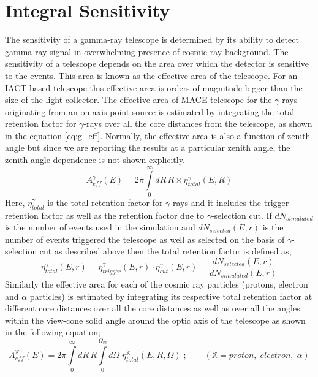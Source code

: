\documentclass[preprint,12pt]{elsarticle}
\begin{document}
\section{Integral Sensitivity}
The sensitivity of a gamma-ray telescope is determined by its ability to detect
gamma-ray signal in overwhelming presence of cosmic ray background. 
The sensitivity of a telescope depends on the area over which the detector is sensitive 
to the events. This area is known as the effective area of the telescope. For an IACT based telescope 
this effective area is orders of magnitude bigger than the size of the light collector. The  
effective area of MACE telescope for the $\gamma$-rays originating from an on-axis point source
is estimated by integrating the total retention factor for $\gamma$-rays over all the core 
distances from the telescope, as shown in the equation \ref{eq:g_eff}. Normally, the effective area is 
also a function of zenith angle but since we are reporting the results at a particular zenith angle, the zenith angle
dependence is not shown explicitly. 
%
\begin{equation}\label{effagamma}
	A_{eff}^{\gamma}(E) = 2\pi \int\limits_0^\infty dR \, R \times \eta_{total}^\gamma(E,R)
\end{equation} \label{eq:g_eff}
%
Here, $\eta_{total}^\gamma$ is the total retention factor for $\gamma$-rays and it
includes the trigger retention factor as well as the retention factor due to $\gamma$-selection cut. 
If $dN_{simulated}$ is the number of events used in the simulation and $dN_{selected}(E,r)$ 
is the number of events triggered the telescope as well as selected on the basis of 
$\gamma$-selection cut as described above then the total retention factor is defined as,
%
\begin{equation}
	\eta_{total}^\gamma(E,r) = \eta_{trigger}^\gamma(E,r)\cdot\eta_{cut}^\gamma(E,r) 
	                         = \frac{dN_{selected} (E,r)}{dN_{simulated} (E,r)}
\end{equation}
%
Similarly the effective area for each of the cosmic ray particles (protons, electron
and $\alpha$ particles) is estimated by integrating its respective total retention factor
at different core distances over all the core distances as well as over all the angles within 
the view-cone solid angle  around the optic axis of the telescope as shown in the following equation;
%
\begin{equation}
	A_{eff}^{\mathbb{X}}(E) = 2\pi \int\limits_0^\infty dR \, R 
	\int\limits_0^{\Omega_{vc}} d\Omega \; \eta_{total}^{\mathbb{X}}(E,R,\Omega)\; ; 
	\quad\quad ({\mathbb{X}} = proton,\; electron,\; \alpha)
\end{equation}
\end{document}

